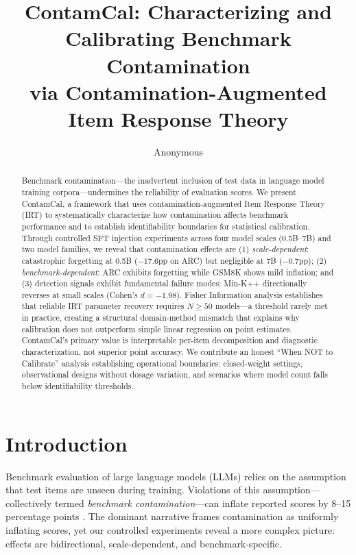 \documentclass[11pt,a4paper]{article}
\title{ContamCal: Characterizing and Calibrating Benchmark Contamination\\via Contamination-Augmented Item Response Theory}
\author{Anonymous}
\begin{document}
\maketitle

\begin{abstract}
Benchmark contamination---the inadvertent inclusion of test data in language model training corpora---undermines the reliability of evaluation scores. We present ContamCal, a framework that uses contamination-augmented Item Response Theory (IRT) to systematically characterize how contamination affects benchmark performance and to establish identifiability boundaries for statistical calibration. Through controlled SFT injection experiments across four model scales (0.5B--7B) and two model families, we reveal that contamination effects are (1) \emph{scale-dependent}: catastrophic forgetting at 0.5B ($-17.6$pp on ARC) but negligible at 7B ($-0.7$pp); (2) \emph{benchmark-dependent}: ARC exhibits forgetting while GSM8K shows mild inflation; and (3) detection signals exhibit fundamental failure modes: Min-K++ directionally reverses at small scales (Cohen's $d = -1.98$). Fisher Information analysis establishes that reliable IRT parameter recovery requires $N \geq 50$ models---a threshold rarely met in practice, creating a structural domain-method mismatch that explains why calibration does not outperform simple linear regression on point estimates. ContamCal's primary value is interpretable per-item decomposition and diagnostic characterization, not superior point accuracy. We contribute an honest ``When NOT to Calibrate'' analysis establishing operational boundaries: closed-weight settings, observational designs without dosage variation, and scenarios where model count falls below identifiability thresholds.
\end{abstract}

\section{Introduction}

Benchmark evaluation of large language models (LLMs) relies on the assumption that test items are unseen during training. Violations of this assumption---collectively termed \emph{benchmark contamination}---can inflate reported scores by 8--15 percentage points \cite{yang2023rethinking,oren2024proving}. The dominant narrative frames contamination as uniformly inflating scores, yet our controlled experiments reveal a more complex picture: effects are bidirectional, scale-dependent, and benchmark-specific.
\end{document}
